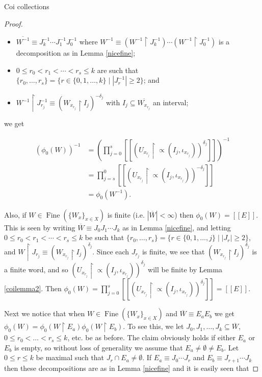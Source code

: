 \documentclass{amsart}
\theoremstyle{definition}\newtheorem{theorem}{Theorem}
\theoremstyle{definition}\newtheorem*{A}{Main Theorem}
\theoremstyle{definition}\newtheorem*{B}{Theorem \ref{elementaryequiv}}
\theoremstyle{definition}\newtheorem*{C}{Theorem \ref{continuous}}
\theoremstyle{definition}\newtheorem*{D}{Theorem \ref{bigisomorphism2}}
\theoremstyle{definition}\newtheorem{bigtheorem}{Main Theorem}
\numberwithin{theorem}{section}
\theoremstyle{definition}\newtheorem{corollary}[theorem]{Corollary}
\theoremstyle{definition}\newtheorem{proposition}[theorem]{Proposition}
\theoremstyle{definition}\newtheorem{definition}[theorem]{Definition}
\theoremstyle{definition}\newtheorem{question}[theorem]{Question}
\theoremstyle{definition}\newtheorem{example}[theorem]{Example}
\theoremstyle{definition}\newtheorem{remark}[theorem]{Remark}
\theoremstyle{definition}\newtheorem{note}[theorem]{Note}
\theoremstyle{definition}\newtheorem{lemma}[theorem]{Lemma}
\theoremstyle{definition}\newtheorem{fact}[theorem]{Fact}
\theoremstyle{definition}\newtheorem{define}[theorem]{Definition}
\theoremstyle{definition}\newtheorem{claim}[theorem]{Claim}
\theoremstyle{definition}\newtheorem{obs}[theorem]{Observation}
\theoremstyle{definition}\newtheorem{definitions}[theorem]{Definitions}
\newcommand{\Fine}{\operatorname{Fine}}
\begin{document}
\begin{section}{Coi collections}
\begin{proof}
\begin{itemize}
\item $\overline{W^{-1}} \equiv J_k^{-1} \cdots J_1^{-1}J_0^{-1}$ where $W^{-1} \equiv (W^{-1} \upharpoonright J_k^{-1}) \cdots (W^{-1} \upharpoonright J_0^{-1})$ is a decomposition as in Lemma \ref{nicefine};

\item $0 \leq r_0 < r_1 < \cdots < r_s \leq k$ are such that $\{r_0, \ldots, r_s\} = \{r \in \{0, 1, \ldots, k\}\mid |J_r^{-1}| \geq 2\}$; and 

\item $W^{-1} \upharpoonright J_{r_j}^{-1} \equiv (W_{x_{r_j}} \upharpoonright I_j)^{-\delta_j}$ with $I_j \subseteq \overline{W_{x_{r_j}}}$ an interval;
\end{itemize}

\noindent we get

$$
\begin{array}{ll}
(\phi_0(W))^{-1} & = (\prod_{j = 0}^s[[(U_{x_{r_j}}\upharpoonright \varpropto(I_j, \iota_{x_{r_j}}))^{\delta_j}]])^{-1}\\
& = \prod_{j = s}^0[[(U_{x_{r_j}}\upharpoonright \varpropto(I_j, \iota_{x_{r_j}}))^{-\delta_j}]]\\
& = \phi_0(W^{-1}).
\end{array}
$$

Also, if $W \in \Fine(\{W_x\}_{x \in X})$ is finite (i.e. $|\overline{W}|< \infty$) then $\phi_0(W) = [[E]]$.  This is seen by writing $\overline{W} \equiv J_0J_1 \cdots J_k$ as in Lemma \ref{nicefine}, and letting $0 \leq r_0 < r_1 < \cdots < r_s \leq k$ be such that $\{r_0, \ldots, r_s\} = \{r \in \{0, 1, \ldots, j\}\mid |J_r| \geq 2\}$, and $W \upharpoonright J_{r_j} \equiv (W_{x_{r_j}} \upharpoonright I_j)^{\delta_j}$.  Since each $J_{r_j}$ is finite, we see that $(W_{x_{r_j}} \upharpoonright I_j)^{\delta_j}$ is a finite word, and so $(U_{x_{r_j}}\upharpoonright \varpropto(I_j, \iota_{x_{r_j}}))^{\delta_j}$ will be finite by Lemma \ref{coilemma2}.  Then $\phi_0(W) = \prod_{j = 0}^s[[(U_{x_{r_j}}\upharpoonright \varpropto(I_j, \iota_{x_{r_j}}))^{\delta_j}]] = [[E]]$.


Next we notice that when $W \in \Fine(\{W_x\}_{x \in X})$ and $\overline{W} \equiv E_aE_b$ we get $\phi_0(W) = \phi_0(W \upharpoonright E_a)\phi_0(W \upharpoonright E_b)$.  To see this, we let $J_0, J_1, \ldots, J_k \subseteq \overline{W}$, $0 \leq r_0 < \ldots < r_s \leq k$, etc. be as before.  The claim obviously holds if either $E_a$ or $E_b$ is empty, so without loss of generality we assume that $E_a \neq \emptyset \neq E_b$.  Let $0 \leq r \leq k$ be maximal such that $J_r \cap E_a \neq \emptyset$.  If $E_a \equiv J_0 \cdots J_r$ and $E_b \equiv J_{r + 1} \cdots J_k$ then these decompositions are as in Lemma \ref{nicefine} and it is easily seen that


\end{proof}
\end{section}
\end{document}
